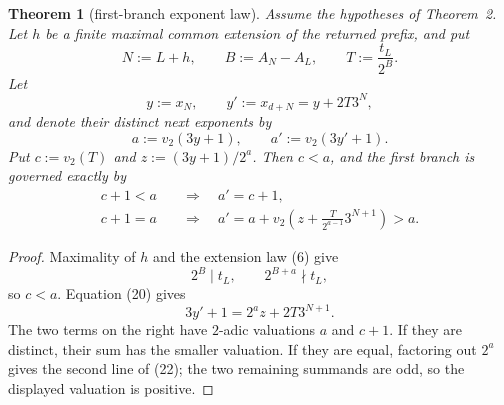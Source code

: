 \documentclass[11pt]{article}
\newtheorem{theorem}{Theorem}
\begin{document}
\begin{theorem}[first-branch exponent law]
Assume the hypotheses of Theorem~2.  Let $h$ be a finite maximal common extension
of the returned prefix, and put
\[
  N:=L+h,
  \qquad
  B:=A_N-A_L,
  \qquad
  T:=\frac{t_L}{2^B}.
  \tag{19}
\]
Let
\[
  y:=x_N,
  \qquad
  y':=x_{d+N}=y+2T3^N,
  \tag{20}
\]
and denote their distinct next exponents by
\[
  a:=v_2(3y+1),
  \qquad
  a':=v_2(3y'+1).
  \tag{21}
\]
Put $c:=v_2(T)$ and $z:=(3y+1)/2^a$.  Then $c<a$, and the first branch is
governed exactly by
\[
\boxed{
  \begin{aligned}
  c+1<a&\quad\Longrightarrow\quad a'=c+1,\\
  c+1=a&\quad\Longrightarrow\quad
  a'=a+v_2\left(z+\frac{T}{2^{a-1}}3^{N+1}\right)>a.
  \end{aligned}}
\tag{22}
\]
\end{theorem}

\begin{proof}
Maximality of $h$ and the extension law (6) give
\[
  2^B\mid t_L,
  \qquad
  2^{B+a}\nmid t_L,
\]
so $c<a$.  Equation (20) gives
\[
  3y'+1=2^az+2T3^{N+1}.
  \tag{23}
\]
The two terms on the right have $2$-adic valuations $a$ and $c+1$.  If they
are distinct, their sum has the smaller valuation.  If they are equal,
factoring out $2^a$ gives the second line of (22); the two remaining
summands are odd, so the displayed valuation is positive.
\end{proof}
\end{document}
